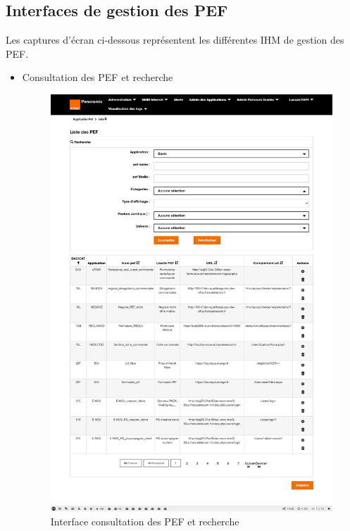 \subsection{Interfaces de gestion des PEF}
Les captures d'écran ci-dessous représentent les différentes IHM de gestion des PEF.
\begin{itemize}
	\item Consultation des PEF et recherche
	\begin{figure}[H]
		\centering
		\includegraphics[width=0.55\linewidth]{img/screenshots/pef/index}
		\caption[Interface consultation des PEF et recherche]{Interface consultation des PEF et recherche}
		\label{fig:index-pef}
	\end{figure}


\end{itemize}

